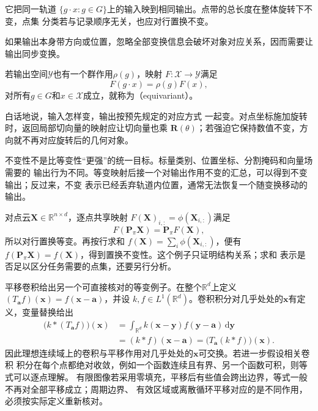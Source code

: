 它把同一轨道
$\{g\cdot x:g\in G\}$上的输入映到相同输出。点带的总长度在整体旋转下不变，点集
分类若与记录顺序无关，也应对行置换不变。

如果输出本身带方向或位置，忽略全部变换信息会破坏对象对应关系，因而需要让输出同步变换。

\begin{definition}[等变映射]
\label{def:geometry-equivariant-map}
若输出空间$\mathcal{Y}$也有一个群作用$\rho(g)$，映射
$F:\mathcal{X}\to\mathcal{Y}$满足
\begin{equation}
  F(g\cdot x)
  =
  \rho(g)F(x),
  \label{eq:geometry-equivariant-map}
\end{equation}
对所有$g\in G$和$x\in\mathcal X$成立，就称为（equivariant）。
\end{definition}

白话地说，输入怎样变，输出按预先规定的对应方式
一起变。对点坐标施加旋转时，返回局部切向量的映射应让切向量也乘
$\bm{R}(\theta)$；若强迫它保持数值不变，方向就不再对应旋转后的几何对象。

不变性不是比等变性“更强”的统一目标。标量类别、位置坐标、分割掩码和向量场需要的
输出行为不同。等变映射后接一个对输出作用不变的汇总，可以得到不变输出；反过来，不变
表示已经丢弃轨道内位置，通常无法恢复一个随变换移动的输出。

对点云$\bm{X}\in\mathbb{R}^{n\times d}$，逐点共享映射
$F(\bm{X})_{i,:}=\phi(\bm{X}_{i,:})$满足
\[
  F(\bm{P}_{\pi}\bm{X})
  =
  \bm{P}_{\pi}F(\bm{X}),
\]
所以对行置换等变。再按行求和
$f(\bm{X})=\sum_i\phi(\bm{X}_{i,:})$，便有
$f(\bm{P}_{\pi}\bm{X})=f(\bm{X})$，得到置换不变性。这个例子只证明结构关系；求和
表示是否足以区分任务需要的点集，还要另行分析。

平移卷积给出另一个可直接核对的等变例子。在整个$\mathbb{R}^d$上定义
$(T_{\bm{a}}f)(\bm{x})=f(\bm{x}-\bm{a})$，并设
$k,f\in L^1(\mathbb{R}^d)$。卷积积分对几乎处处的$\bm{x}$有定义，变量替换给出
\begin{align}
  \bigl(k*(T_{\bm{a}}f)\bigr)(\bm{x})
  &=
  \int_{\mathbb{R}^d}
  k(\bm{x}-\bm{y})f(\bm{y}-\bm{a})\,\mathrm{d}\bm{y}\\
  &=
  (k*f)(\bm{x}-\bm{a})
  =
  \bigl(T_{\bm{a}}(k*f)\bigr)(\bm{x}).
  \label{eq:geometry-translation-convolution-equivariance}
\end{align}
因此理想连续域上的卷积与平移作用对几乎处处的$\bm{x}$可交换。若进一步假设相关卷积
积分在每个点都绝对收敛，例如一个函数连续且有界、另一个函数可积，则等式可以逐点理解。
有限图像若采用零填充，平移后有些值会跨出边界，等式一般不再对全部平移成立；周期边界、
有效区域或离散循环平移对应的是不同作用，必须按实际定义重新核对。

